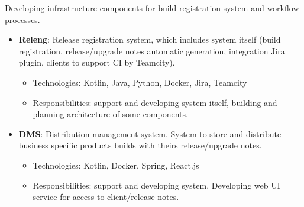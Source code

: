 \documentclass{cv}
\begin{document}
\begin{cvblock}{%
  }

  Developing infrastructure components for build registration
  system and workflow processes.

  \begin{itemize}
    \item \textbf{Releng}: Release registration system, which includes system itself
      (build registration, release/upgrade notes automatic generation,
      integration Jira plugin, clients to support CI by Teamcity).
      \begin{itemize}
        \item Technologies: Kotlin, Java, Python, Docker, Jira, Teamcity
        \item Responsibilities: support and developing system itself,
          building and planning architecture of some components.
      \end{itemize}
    \item \textbf{DMS}: Distribution management system. System to store and distribute
      business specific products builds with theirs release/upgrade notes.
      \begin{itemize}
        \item Technologies: Kotlin, Docker, Spring, React.js
        \item Responsibilities: support and developing system. Developing web
          UI service for access to client/release notes.
      \end{itemize}
  \end{itemize}
\end{cvblock}

\vspace{2em}
\end{document}

